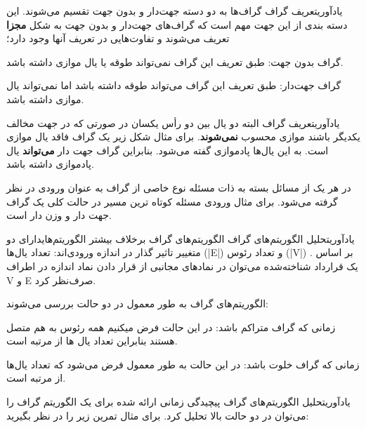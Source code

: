 
\begin{itemframe-s}{یادآوری}{تعریف گراف}
\itm
گراف‌ها به دو دسته جهت‌دار و بدون جهت تقسیم می‌شوند. این دسته بندی از این جهت مهم است که گراف‌های جهت‌دار و بدون جهت به شکل \textbf{مجزا} تعریف می‌شوند و تفاوت‌هایی در تعریف آنها وجود دارد؛
\item[۱]
گراف بدون جهت: طبق تعریف این گراف نمی‌تواند طوقه یا یال موازی داشته باشد.
\item[۲]
گراف جهت‌دار: طبق تعریف این گراف می‌تواند طوقه داشته باشد اما نمی‌تواند یال موازی داشته باشد.

\end{itemframe-s}

\begin{itemframe-s}{یادآوری}{تعریف گراف}
\itm
البته دو یال بین دو رأس یکسان در صورتی که در جهت مخالف یکدیگر باشند موازی محسوب \textbf{نمی‌شوند}. برای مثال شکل زیر یک گراف فاقد یال موازی است.
\itm
 به این یال‌ها پادموازی
 گفته می‌شود. بنابراین گراف جهت دار \textbf{می‌تواند} یال پادموازی داشته باشد.

\itm
در هر یک از مسائل بسته به ذات مسئله نوع خاصی از گراف به عنوان ورودی در نظر گرفته می‌شود. برای مثال ورودی مسئله کوتاه ترین مسیر در حالت کلی یک گراف جهت دار و وزن دار است.
\end{itemframe-s}


\begin{itemframe-s}{یادآوری}{تحلیل الگوریتم‌های گراف}
\itm
الگوریتم‌های گراف برخلاف بیشتر الگوریتم‌هایدارای دو متغییر تاثیر گذار در اندازه ورودی‌اند: تعداد یال‌ها (|E|) و تعداد رئوس (|V|) .
\itm
بر اساس یک قرارداد شناخته‌شده می‌توان در نمادهای مجانبی از قرار دادن نماد اندازه در اطراف V و E صرف‌نظر ‌کرد.

\itm
الگوریتم‌های گراف به طور معمول در دو حالت بررسی می‌شوند:
\item[الف]
زمانی که گراف متراکم باشد: در این حالت فرض میکنیم همه رئوس به هم متصل هستند بنابراین تعداد یال ها از مرتبه
است.
\item[ب]
زمانی که گراف خلوت باشد:‌ در این حالت به طور معمول فرض می‌شود که تعداد یال‌ها از مرتبه
است.
\end{itemframe-s}


\begin{itemframe-s}{یادآوری}{تحلیل الگوریتم‌های گراف}
\itm
پیچیدگی زمانی ارائه شده برای یک الگوریتم گراف را می‌توان در دو حالت بالا تحلیل کرد. برای مثال تمرین زیر را در نظر بگیرید:

\end{itemframe-s}


